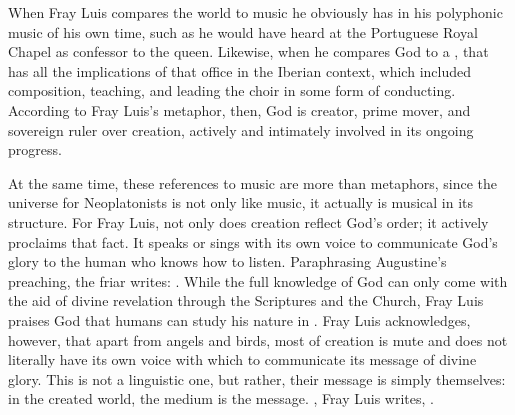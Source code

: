 
When Fray Luis compares the world to music  he
obviously has in his  polyphonic music of his own time, such
as he would have heard at the Portuguese Royal Chapel as confessor to the
queen.
Likewise, when he compares God to a , that has all
the implications of that office in the Iberian context, which included
composition, teaching, and leading the choir in some form of conducting.
According to Fray Luis's metaphor, then, God is creator, prime mover, and
sovereign ruler over creation, actively and intimately involved in its ongoing
progress.


At the same time, these references to music are more than metaphors, since the
universe for Neoplatonists is not only like music, it actually is musical in
its structure.
For Fray Luis, not only does creation reflect God's order; it actively
proclaims that fact.
It speaks or sings with its own voice to communicate God's glory to the human
who knows how to listen.
Paraphrasing Augustine's preaching, the friar writes: .%
    \Autocite[185, glossing Augustine's commentary on ]
    {LuisdeGranada:Simbolo} 
While the full knowledge of God can only come with the aid of divine revelation
through the Scriptures and the Church, Fray Luis praises God that humans can
study his nature in .%
    \Autocite[186]{LuisdeGranada:Simbolo}
Fray Luis acknowledges, however, that apart from angels and birds, most of
creation is mute and does not literally have its own voice with which to
communicate its message of divine glory.
This  is not a linguistic one, but rather, their message is
simply themselves: in the created world, the medium is the message.
, Fray Luis writes, .%
    \Autocite[192]{LuisdeGranada:Simbolo}

